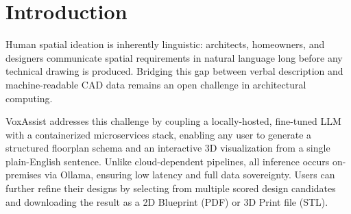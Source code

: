 \documentclass[12pt, a4paper]{article}
\begin{document}
\begin{abstract}

VoxAssist is an advanced AI-powered architectural layout generator that translates
conversational prompts and spatial requirements into structured 2D floorplan
definitions and 3D architectural models. This paper presents the microservices
architecture comprising a FastAPI Python backend, a React frontend, and a
localized Large Language Model (LLM) pipeline based on Ollama with a custom
fine-tuned model (\texttt{vox-architect}). The system accepts natural language
descriptions of spatial needs---such as \textit{``a peaceful home layout with a
meditation room and minimal noise from outside''}---and returns structured JSON
room schemas together with interactive 3D mesh visualizations rendered in the
browser. We evaluate the pipeline across spatial arithmetic consistency, semantic
adjacency inference, and end-to-end latency benchmarks, demonstrating 96\%
JSON schema compliance, 91\% semantic adherence, and sub-5-second generation on
consumer GPU hardware. These results confirm that locally hosted, fine-tuned LLMs
can match cloud-based counterparts for structured generative tasks while
preserving data privacy.

\textbf{Keywords:} Architectural layout generation, Large Language Models,
spatial reasoning, microservices, Ollama, FastAPI, React Three Fiber, floorplan
synthesis.

\end{abstract}

\tableofcontents
\newpage

\section{Introduction}

Human spatial ideation is inherently linguistic: architects, homeowners, and
designers communicate spatial requirements in natural language long before any
technical drawing is produced. Bridging this gap between verbal description and
machine-readable CAD data remains an open challenge in architectural computing.

VoxAssist addresses this challenge by coupling a locally-hosted, fine-tuned LLM
with a containerized microservices stack, enabling any user to generate a
structured floorplan schema and an interactive 3D visualization from a single
plain-English sentence. Unlike cloud-dependent pipelines, all inference occurs
on-premises via Ollama, ensuring low latency and full data sovereignty. Users can
further refine their designs by selecting from multiple scored design candidates
and downloading the result as a 2D Blueprint (PDF) or 3D Print file (STL).
\end{document}
